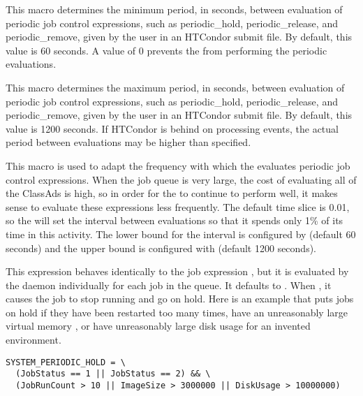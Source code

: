 \begin{description}
\label{param:PeriodicExprInterval}
\item[\Macro{PERIODIC\_EXPR\_INTERVAL}]
  This macro determines the minimum period,
  in seconds, between evaluation of periodic job control expressions,
  such as periodic\_hold, periodic\_release, and periodic\_remove,
  given by the user in an HTCondor submit file. By default, this value is
  60 seconds.  A value of 0 prevents the  from
  performing the periodic evaluations.

\label{param:MaxPeriodicExprInterval}
\item[\Macro{MAX\_PERIODIC\_EXPR\_INTERVAL}]
  This macro determines the maximum period,
  in seconds, between evaluation of periodic job control expressions,
  such as periodic\_hold, periodic\_release, and periodic\_remove,
  given by the user in an HTCondor submit file. By default, this value is
  1200 seconds.  If HTCondor is behind on processing events, the actual
  period between evaluations may be higher than specified.

\label{param:PeriodicExprTimeslice}
\item[\Macro{PERIODIC\_EXPR\_TIMESLICE}]
  This macro is used to adapt the
  frequency with which the  evaluates periodic job
  control expressions.  When the job queue is very large, the cost of
  evaluating all of the ClassAds is high, so in order for the
   to continue to perform well, it makes sense to
  evaluate these expressions less frequently.  The default time slice
  is 0.01, so the  will set the interval between
  evaluations so that it spends only 1\% of its time in this activity.
  The lower bound for the interval is configured by
   (default 60 seconds) and the
  upper bound is configured with 
  (default 1200 seconds).

\label{param:SystemPeriodicHold}
\item[\Macro{SYSTEM\_PERIODIC\_HOLD}]
  This expression behaves identically
  to the job expression , but it is evaluated by
  the  daemon individually for each job in the queue.
  It defaults to .
  When , it causes the job to stop running and go on hold.
  Here is an
  example that puts jobs on hold if they have been restarted too many
  times, have an unreasonably large virtual memory , or have
  unreasonably large disk usage for an invented environment.

\footnotesize
\begin{verbatim}
SYSTEM_PERIODIC_HOLD = \
  (JobStatus == 1 || JobStatus == 2) && \
  (JobRunCount > 10 || ImageSize > 3000000 || DiskUsage > 10000000)
\end{verbatim}
\normalsize


\end{description}
